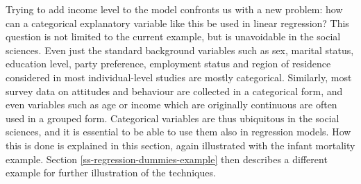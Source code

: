 \documentclass[11pt,a4paper,openany]{book}
\begin{document}
Trying to add income level to the model confronts us with a new problem:
how can a categorical explanatory variable like this be used in linear
regression? This question is not limited to the current example, but is
unavoidable in the social sciences. Even just the standard background
variables such as sex, marital status, education level, party
preference, employment status and region of residence considered in most
individual-level studies are mostly categorical. Similarly, most survey
data on attitudes and behaviour are collected in a categorical form, and
even variables such as age or income which are originally continuous are
often used in a grouped form. Categorical variables are thus ubiquitous
in the social sciences, and it is essential to be able to use them also
in regression models. How this is done is explained in this section,
again illustrated with the infant mortality example. Section
\ref{ss-regression-dummies-example} then describes a different example
for further illustration of the techniques.
\end{document}
